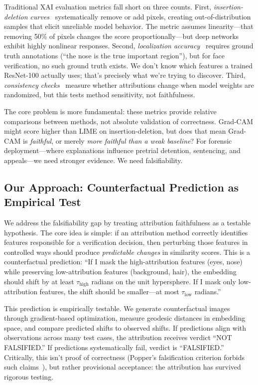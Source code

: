 Traditional XAI evaluation metrics fall short on three counts. First, \textit{insertion-deletion curves}~\cite{petsiuk2018rise} systematically remove or add pixels, creating out-of-distribution samples that elicit unreliable model behavior. The metric assumes linearity—that removing 50\% of pixels changes the score proportionally—but deep networks exhibit highly nonlinear responses. Second, \textit{localization accuracy}~\cite{zhou2016learning} requires ground truth annotations (``the nose is the true important region''), but for face verification, no such ground truth exists. We don't know which features a trained ResNet-100 actually uses; that's precisely what we're trying to discover. Third, \textit{consistency checks}~\cite{adebayo2018sanity} measure whether attributions change when model weights are randomized, but this tests method sensitivity, not faithfulness.

The core problem is more fundamental: these metrics provide relative comparisons between methods, not absolute validation of correctness. Grad-CAM might score higher than LIME on insertion-deletion, but does that mean Grad-CAM is \textit{faithful}, or merely \textit{more faithful than a weak baseline}? For forensic deployment—where explanations influence pretrial detention, sentencing, and appeals—we need stronger evidence. We need falsifiability.

\subsection{Our Approach: Counterfactual Prediction as Empirical Test}

We address the falsifiability gap by treating attribution faithfulness as a testable hypothesis. The core idea is simple: if an attribution method correctly identifies features responsible for a verification decision, then perturbing those features in controlled ways should produce \textit{predictable changes} in similarity scores. This is a counterfactual prediction: ``If I mask the high-attribution features (eyes, nose) while preserving low-attribution features (background, hair), the embedding should shift by at least $\tau_{\text{high}}$ radians on the unit hypersphere. If I mask only low-attribution features, the shift should be smaller—at most $\tau_{\text{low}}$ radians.''

This prediction is empirically testable. We generate counterfactual images through gradient-based optimization, measure geodesic distances in embedding space, and compare predicted shifts to observed shifts. If predictions align with observations across many test cases, the attribution receives verdict ``NOT FALSIFIED.'' If predictions systematically fail, verdict is ``FALSIFIED.'' Critically, this isn't proof of correctness (Popper's falsification criterion forbids such claims~\cite{popper1959logic}), but rather provisional acceptance: the attribution has survived rigorous testing.

